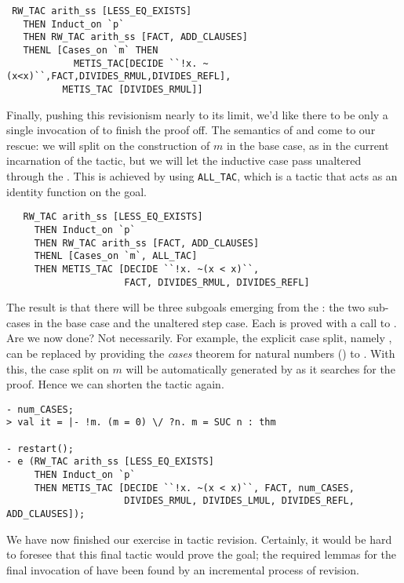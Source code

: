 \begin{hol}
\begin{verbatim}
 RW_TAC arith_ss [LESS_EQ_EXISTS]
   THEN Induct_on `p`
   THEN RW_TAC arith_ss [FACT, ADD_CLAUSES]
   THENL [Cases_on `m` THEN
            METIS_TAC[DECIDE ``!x. ~(x<x)``,FACT,DIVIDES_RMUL,DIVIDES_REFL],
          METIS_TAC [DIVIDES_RMUL]]
\end{verbatim}
\end{hol}

\noindent
Finally, pushing this revisionism nearly to its limit, we'd
like there to be only a single invocation of  to finish
the proof off. The semantics of  and  come to
our rescue: we will split on the construction of $m$ in the base case,
as in the current incarnation of the tactic, but we will let the
inductive case pass unaltered through the . This is achieved
by using \verb+ALL_TAC+, which is a tactic that acts as an identity
function on the goal.
\begin{hol}
\begin{verbatim}
   RW_TAC arith_ss [LESS_EQ_EXISTS]
     THEN Induct_on `p`
     THEN RW_TAC arith_ss [FACT, ADD_CLAUSES]
     THENL [Cases_on `m`, ALL_TAC]
     THEN METIS_TAC [DECIDE ``!x. ~(x < x)``,
                     FACT, DIVIDES_RMUL, DIVIDES_REFL]
\end{verbatim}
\end{hol}

\noindent
The result is that there will be three subgoals emerging from the
: the two sub-cases in the base case and the unaltered step
case. Each is proved with a call to . Are we now done?
Not necessarily. For example, the explicit case split, namely ,
can be replaced by providing the \emph{cases} theorem for natural numbers
() to . With this, the case split on $m$ will be
automatically generated by  as it searches for the proof. Hence we
can shorten the tactic again.
\begin{session}
\begin{verbatim}
- num_CASES;
> val it = |- !m. (m = 0) \/ ?n. m = SUC n : thm

- restart();
- e (RW_TAC arith_ss [LESS_EQ_EXISTS]
     THEN Induct_on `p`
     THEN METIS_TAC [DECIDE ``!x. ~(x < x)``, FACT, num_CASES,
                     DIVIDES_RMUL, DIVIDES_LMUL, DIVIDES_REFL, ADD_CLAUSES]);
\end{verbatim}
\end{session}
We have now finished our exercise in tactic revision. Certainly, it
would be hard to foresee that this final tactic would prove the
goal; the required lemmas for the final invocation of 
have been found by an incremental process of revision.

